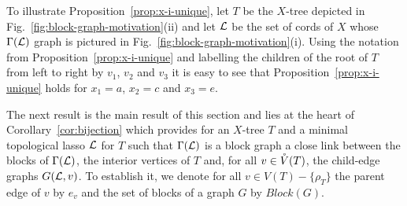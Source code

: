 To illustrate Proposition~\ref{prop:x-i-unique}, 
let $T$ be the $X$-tree depicted
in Fig.~\ref{fig:block-graph-motivation}(ii)
and let ${\mathcal L}$ be the set of cords of $X$ whose $\Gamma({\mathcal L})$ graph is
pictured in  Fig.~\ref{fig:block-graph-motivation}(i). 
Using the notation from Proposition~\ref{prop:x-i-unique} and
 labelling the children of the root of $T$
from left to right by $v_1$, $v_2$ and $v_3$ 
it is easy to see that  Proposition~\ref{prop:x-i-unique} holds for
$x_1=a$, $x_2=c$ and $x_3=e$. 

The next result is the main result of this section and
lies at the heart of Corollary~\ref{cor:bijection}
which provides for an $X$-tree $T$ and a minimal topological lasso
${\mathcal L}$ for $T$ such that $\Gamma({\mathcal L})$ is a block graph
a close link between
the blocks of $\Gamma({\mathcal L})$, the interior vertices of $T$ and, for all 
$v\in \mathring{V}(T)$, the child-edge graphs $G({\mathcal L},v)$. To establish it, we denote 
for all $v\in V(T)-\{\rho_T\}$ the parent edge of $v$ by $e_v$ and
the set of blocks of
a graph $G$ by $Block(G)$.


